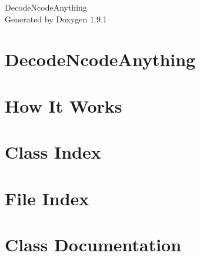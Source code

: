 \let\mypdfximage\pdfximage\def\pdfximage{\immediate\mypdfximage}\documentclass[twoside]{book}
\newcommand{\+}{\discretionary{\mbox{\scriptsize$\hookleftarrow$}}{}{}}
\newcommand{\clearemptydoublepage}{%
  \newpage{\pagestyle{empty}\cleardoublepage}%
}
\begin{document}
\raggedbottom

\hypersetup{pageanchor=false,
             bookmarksnumbered=true,
             pdfencoding=unicode
            }
\begin{titlepage}
\vspace*{7cm}
\begin{center}%
{\Large Decode\+Ncode\+Anything }\\
\vspace*{1cm}
{\large Generated by Doxygen 1.9.1}\\
\end{center}
\end{titlepage}
\clearemptydoublepage
{}
\tableofcontents
\clearemptydoublepage
{}
\hypersetup{pageanchor=true}

\chapter{Decode\+Ncode\+Anything}
\label{md_README}

\chapter{How It Works}
\label{md_tmp_README}

\chapter{Class Index}

\chapter{File Index}

\chapter{Class Documentation}















\end{document}
